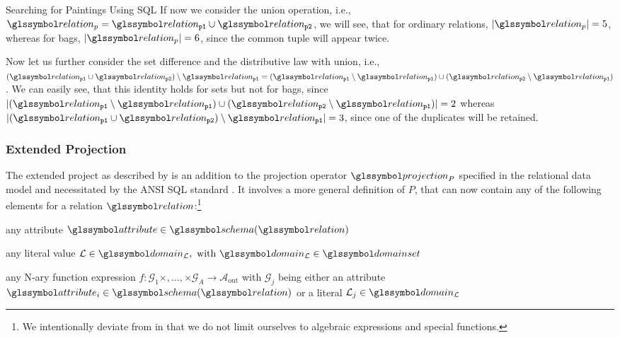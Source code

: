 \begin{example}[label=example:bag_vs_set]{Searching for Paintings Using SQL}{}
    If now we consider the union operation, i.e., $\relation_{p} = \relation_{\mathtt{p1}} \cup \relation_{\mathtt{p2}}$, we will see, that for ordinary relations, $|\relation_{p}| = 5$, whereas for bags, $|\relation_{p}| = 6$, since the common tuple will appear twice.

    Now let us further consider the set difference and the distributive law with union, i.e., $(\relation_{\mathtt{p1}} \cup \relation_{\mathtt{p2}}) \setminus \relation_{\mathtt{p1}} = (\relation_{\mathtt{p1}} \setminus \relation_{\mathtt{p1}}) \cup (\relation_{\mathtt{p2}} \setminus \relation_{\mathtt{p1}})$. We can easily see, that this identity holds for sets but not for bags, since $|(\relation_{\mathtt{p1}} \setminus \relation_{\mathtt{p1}}) \cup (\relation_{\mathtt{p2}} \setminus \relation_{\mathtt{p1}})| = 2$ whereas $|(\relation_{\mathtt{p1}} \cup \relation_{\mathtt{p2}}) \setminus \relation_{\mathtt{p1}}| = 3$, since one of the duplicates will be retained.
\end{example}

\subsubsection{Extended Projection}

The extended project as described by \cite{Garcia:2009Database} is an addition to the projection operator $\projection_{P}$ specified in the relational data model and necessitated by the ANSI SQL standard \cite[]{XOpen:1996SQL}. It involves a more general definition of $P$, that can now contain any of the following elements for a relation $\relation$:\footnote{We intentionally deviate from \cite{Garcia:2009Database} in that we do not limit ourselves to algebraic expressions and special functions.}
\begin{enumerate*}[label=(\roman*),itemjoin={{, }}, itemjoin*={{, or, }}, after={{.}}]
    \item any attribute $\attribute \in \schema(\relation)$
    \item any literal value $\mathcal{L} \in \domain_{\mathcal{L}}, \text{ with } \domain_{\mathcal{L}} \in \domainset$
    \item any N-ary function expression $f \colon \mathcal{G}_1 \times, \ldots, \times \mathcal{G}_A \rightarrow \mathcal{A}_{\text{out}}$ with $\mathcal{G}_j$ being either an attribute $\attribute_i \in \schema(\relation)$ or a literal $\mathcal{L}_j \in \domain_{\mathcal{L}}$
\end{enumerate*}

